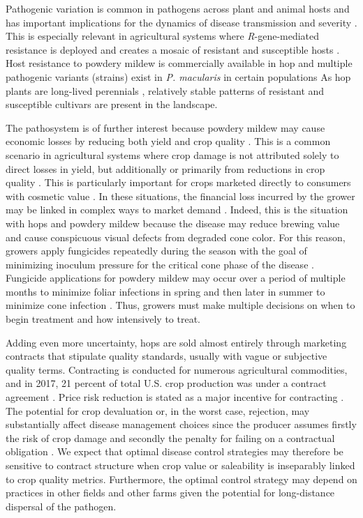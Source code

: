 \documentclass[10pt,a4paper]{article}
\begin{document}
Pathogenic variation is common in pathogens across plant and animal hosts \parencite{Burdon1997, Koelle2022} and has important implications for the dynamics of disease transmission and severity \parencite{Mundt2002, Ostfeld2012}. This is especially relevant in agricultural systems where \textit{R}-gene-mediated resistance is deployed and creates a mosaic of resistant and susceptible hosts \parencite{McDonald2002}. Host resistance to powdery mildew is commercially available in hop and multiple pathogenic variants (strains) exist in \textit{P. macularis} in certain populations \parencite{Gent2017, Royle1978, Wolfenbarger2016} As hop plants are long-lived perennials \parencite{Neve1991}, relatively stable patterns of resistant and susceptible cultivars are present in the landscape.

The pathosystem is of further interest because powdery mildew may cause economic losses by reducing both yield and crop quality \parencite{Gent2014, Neve1991, Royle1978}. This is a common scenario in agricultural systems where crop damage is not attributed solely to direct losses in yield, but additionally or primarily from reductions in crop quality \parencite{Savary2006}. This is particularly important for crops marketed directly to consumers with cosmetic value \parencite{Esker2013, Zadoks1985}. In these situations, the financial loss incurred by the grower may be linked in complex ways to market demand \parencite{Zadoks1985}. Indeed, this is the situation with hops and powdery mildew because the disease may reduce brewing value and cause conspicuous visual defects from degraded cone color. For this reason, growers apply fungicides repeatedly during the season with the goal of minimizing inoculum pressure for the critical cone phase of the disease \parencite{Nelson2015, Royle1978}. Fungicide applications for powdery mildew may occur over a period of multiple months to minimize foliar infections in spring and then later in summer to minimize cone infection \parencite{Nelson2015, Twomey2015}. Thus, growers must make multiple decisions on when to begin treatment and how intensively to treat.

Adding even more uncertainty, hops are sold almost entirely through marketing contracts that stipulate quality standards, usually with vague or subjective quality terms. Contracting is conducted for numerous agricultural commodities, and in 2017, 21 percent of total U.S. crop production was under a contract agreement \parencite{MacDonald2019}. Price risk reduction is stated as a major incentive for contracting \parencite{Key2005}. The potential for crop devaluation or, in the worst case, rejection, may substantially affect disease management choices since the producer assumes firstly the risk of crop damage and secondly the penalty for failing on a contractual obligation \parencite{Zhang2015}. We expect that optimal disease control strategies may therefore be sensitive to contract structure when crop value or saleability is inseparably linked to crop quality metrics. Furthermore, the optimal control strategy may depend on practices in other fields and other farms given the potential for long-distance dispersal of the pathogen.
\end{document}
